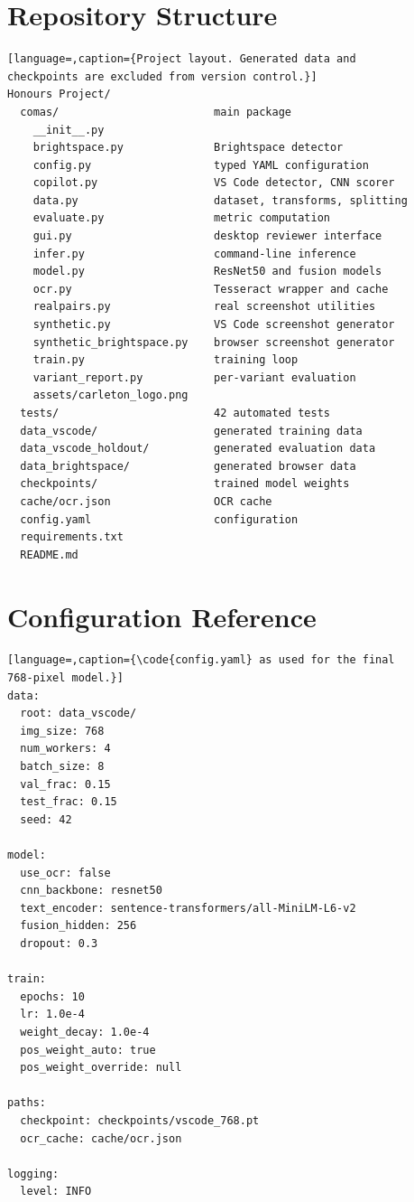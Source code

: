 \documentclass[12pt,oneside]{report}
\newcommand{\code}[1]{\texttt{\small #1}}
\begin{document}
\appendix

\chapter{Repository Structure}

\begin{lstlisting}[language=,caption={Project layout. Generated data and
checkpoints are excluded from version control.}]
Honours Project/
  comas/                        main package
    __init__.py
    brightspace.py              Brightspace detector
    config.py                   typed YAML configuration
    copilot.py                  VS Code detector, CNN scorer
    data.py                     dataset, transforms, splitting
    evaluate.py                 metric computation
    gui.py                      desktop reviewer interface
    infer.py                    command-line inference
    model.py                    ResNet50 and fusion models
    ocr.py                      Tesseract wrapper and cache
    realpairs.py                real screenshot utilities
    synthetic.py                VS Code screenshot generator
    synthetic_brightspace.py    browser screenshot generator
    train.py                    training loop
    variant_report.py           per-variant evaluation
    assets/carleton_logo.png
  tests/                        42 automated tests
  data_vscode/                  generated training data
  data_vscode_holdout/          generated evaluation data
  data_brightspace/             generated browser data
  checkpoints/                  trained model weights
  cache/ocr.json                OCR cache
  config.yaml                   configuration
  requirements.txt
  README.md
\end{lstlisting}

\chapter{Configuration Reference}

\begin{lstlisting}[language=,caption={\code{config.yaml} as used for the final
768-pixel model.}]
data:
  root: data_vscode/
  img_size: 768
  num_workers: 4
  batch_size: 8
  val_frac: 0.15
  test_frac: 0.15
  seed: 42

model:
  use_ocr: false
  cnn_backbone: resnet50
  text_encoder: sentence-transformers/all-MiniLM-L6-v2
  fusion_hidden: 256
  dropout: 0.3

train:
  epochs: 10
  lr: 1.0e-4
  weight_decay: 1.0e-4
  pos_weight_auto: true
  pos_weight_override: null

paths:
  checkpoint: checkpoints/vscode_768.pt
  ocr_cache: cache/ocr.json

logging:
  level: INFO
\end{lstlisting}
\end{document}
